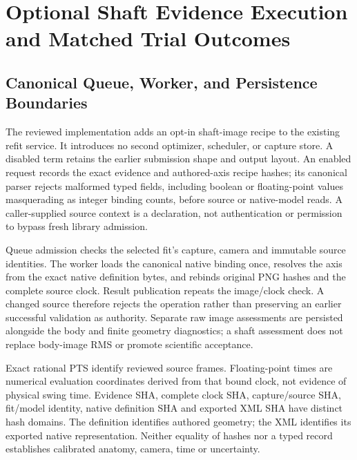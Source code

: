 \documentclass[11pt,letterpaper]{article}
\newcommand{\reportsection}[1]{\section{#1}}
\begin{document}

\reportsection{Optional Shaft Evidence Execution and Matched Trial Outcomes}
\label{sec:actual-shaft-execution}
\subsection{Canonical Queue, Worker, and Persistence Boundaries}
The reviewed implementation adds an opt-in shaft-image recipe to the existing
refit service. It introduces no second optimizer, scheduler, or capture store.
A disabled term retains the earlier submission shape and output layout.
An enabled request records the exact evidence and authored-axis recipe hashes;
its canonical parser rejects malformed typed fields, including boolean or
floating-point values masquerading as integer binding counts, before source
or native-model reads. A caller-supplied source context is a declaration,
not authentication or permission to bypass fresh library admission.

Queue admission checks the selected fit's capture, camera and immutable source
identities. The worker loads the canonical native binding once, resolves the
axis from the exact native definition bytes, and rebinds original PNG hashes
and the complete source clock. Result publication repeats the image/clock
check. A changed source therefore rejects the operation rather than preserving
an earlier successful validation as authority. Separate raw image assessments
are persisted alongside the body and finite geometry diagnostics; a shaft
assessment does not replace body-image RMS or promote scientific acceptance.

Exact rational PTS identify reviewed source frames. Floating-point times are
numerical evaluation coordinates derived from that bound clock, not evidence
of physical swing time. Evidence SHA, complete clock SHA, capture/source SHA,
fit/model identity, native definition SHA and exported XML SHA have distinct
hash domains. The definition identifies authored geometry; the XML identifies
its exported native representation. Neither equality of hashes nor a typed
record establishes calibrated anatomy, camera, time or uncertainty.
\end{document}
